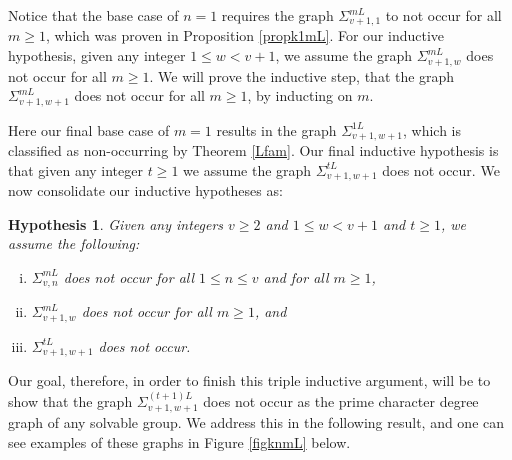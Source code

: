 \documentclass[11pt]{amsart}
\newtheorem{hyp}[theorem]{Hypothesis}
\theoremstyle{definition}
\theoremstyle{remark}
\numberwithin{equation}{section}
\newcommand{\SLi}[3]{\Sigma_{#1,#2}^{#3L}} %
\begin{document}
Notice that the base case of $n = 1$ requires the graph $\SLi{v+1}{1}{m}$ to not occur for all $m\geq 1$, which was proven in Proposition \ref{propk1mL}. For our inductive hypothesis, given any integer $1 \leq w < v+1$, we assume the graph $\SLi{v+1}{w}{m}$ does not occur for all $m \geq 1$. We will prove the inductive step, that the graph $\SLi{v+1}{w+1}{m}$ does not occur for all $m\geq 1$, by inducting on $m$. 

Here our final base case of $m = 1$ results in the graph $\SLi{v+1}{w+1}{1}$, which is classified as non-occurring by Theorem \ref{Lfam}. Our final inductive hypothesis is that given any integer $t\geq 1$ we assume the graph $\SLi{v+1}{w+1}{t}$ does not occur. We now consolidate our inductive hypotheses as:

\begin{hyp}\label{hypknmL}
Given any integers $v \geq 2$ and $1\leq w < v+1$ and $t \geq 1$, we assume the following:
\begin{enumerate}[(i)]
    \item\label{hypkni} $\SLi{v}{n}{m}$ does not occur for all $1 \leq n \leq v$ and for all $m\geq 1$,
    \item\label{hypknii} $\SLi{v+1}{w}{m}$ does not occur for all $m\geq 1$, and
    \item\label{hypkniii} $\SLi{v+1}{w+1}{t}$ does not occur.
\end{enumerate}
\end{hyp}

Our goal, therefore, in order to finish this triple inductive argument, will be to show that the graph $\SLi{v+1}{w+1}{(t+1)}$ does not occur as the prime character degree graph of any solvable group. We address this in the following result, and one can see examples of these graphs in Figure \ref{figknmL} below.
\end{document}
